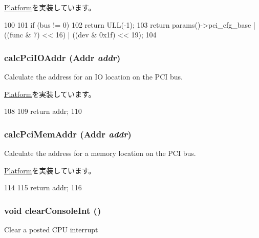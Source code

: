 \hyperlink{classPlatform_a4a2bdce1a8794dd3ea6ca12b36320433}{Platform}を実装しています。


\begin{DoxyCode}
100 {
101     if (bus != 0)
102         return ULL(-1);
103     return params()->pci_cfg_base | ((func & 7) << 16) | ((dev & 0x1f) << 19);
104 }
\end{DoxyCode}
\hypertarget{classRealView_a83afd16479598cfaeb035fd30eeedd8b}{
\subsubsection[{calcPciIOAddr}]{ calcPciIOAddr ({\bf Addr} {\em addr})}}
\label{classRealView_a83afd16479598cfaeb035fd30eeedd8b}
Calculate the address for an IO location on the PCI bus. 

\hyperlink{classPlatform_a3d1d55996e865ab1b65c732496c08b00}{Platform}を実装しています。


\begin{DoxyCode}
108 {
109     return addr;
110 }
\end{DoxyCode}
\hypertarget{classRealView_aa2acd9bf04ba56b380e7812ce29971b5}{
\subsubsection[{calcPciMemAddr}]{ calcPciMemAddr ({\bf Addr} {\em addr})}}
\label{classRealView_aa2acd9bf04ba56b380e7812ce29971b5}
Calculate the address for a memory location on the PCI bus. 

\hyperlink{classPlatform_a303d8161e77b31b8425cb320562a54b2}{Platform}を実装しています。


\begin{DoxyCode}
114 {
115     return addr;
116 }
\end{DoxyCode}
\hypertarget{classRealView_ad38e46034c079c8e765d3ac7eb99337d}{
\subsubsection[{clearConsoleInt}]{\setlength{\rightskip}{0pt plus 5cm}void clearConsoleInt ()}}
\label{classRealView_ad38e46034c079c8e765d3ac7eb99337d}
Clear a posted CPU interrupt 

